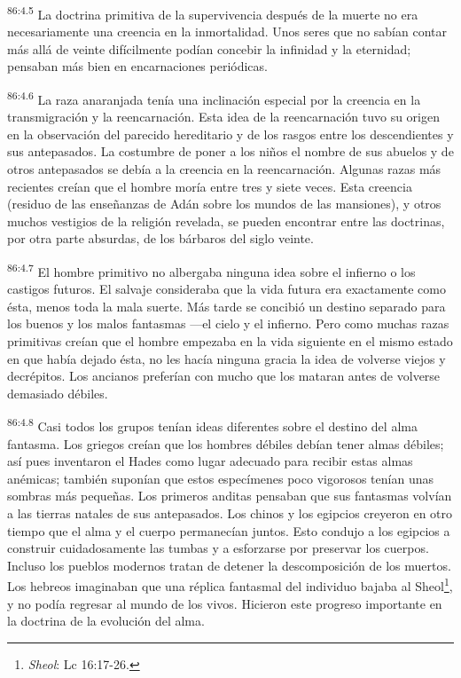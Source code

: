 \documentclass[twoside, 11pt]{book}
\begin{document}
\par
\textsuperscript{86:4.5} La doctrina primitiva de la supervivencia después de la muerte no era necesariamente una creencia en la inmortalidad. Unos seres que no sabían contar más allá de veinte difícilmente podían concebir la infinidad y la eternidad; pensaban más bien en encarnaciones periódicas.

\par
\textsuperscript{86:4.6} La raza anaranjada tenía una inclinación especial por la creencia en la transmigración y la reencarnación. Esta idea de la reencarnación tuvo su origen en la observación del parecido hereditario y de los rasgos entre los descendientes y sus antepasados. La costumbre de poner a los niños el nombre de sus abuelos y de otros antepasados se debía a la creencia en la reencarnación. Algunas razas más recientes creían que el hombre moría entre tres y siete veces. Esta creencia (residuo de las enseñanzas de Adán sobre los mundos de las mansiones), y otros muchos vestigios de la religión revelada, se pueden encontrar entre las doctrinas, por otra parte absurdas, de los bárbaros del siglo veinte.

\par
\textsuperscript{86:4.7} El hombre primitivo no albergaba ninguna idea sobre el infierno o los castigos futuros. El salvaje consideraba que la vida futura era exactamente como ésta, menos toda la mala suerte. Más tarde se concibió un destino separado para los buenos y los malos fantasmas ---el cielo y el infierno. Pero como muchas razas primitivas creían que el hombre empezaba en la vida siguiente en el mismo estado en que había dejado ésta, no les hacía ninguna gracia la idea de volverse viejos y decrépitos. Los ancianos preferían con mucho que los mataran antes de volverse demasiado débiles.

\par
\textsuperscript{86:4.8} Casi todos los grupos tenían ideas diferentes sobre el destino del alma fantasma. Los griegos creían que los hombres débiles debían tener almas débiles; así pues inventaron el Hades como lugar adecuado para recibir estas almas anémicas; también suponían que estos especímenes poco vigorosos tenían unas sombras más pequeñas. Los primeros anditas pensaban que sus fantasmas volvían a las tierras natales de sus antepasados. Los chinos y los egipcios creyeron en otro tiempo que el alma y el cuerpo permanecían juntos. Esto condujo a los egipcios a construir cuidadosamente las tumbas y a esforzarse por preservar los cuerpos. Incluso los pueblos modernos tratan de detener la descomposición de los muertos. Los hebreos imaginaban que una réplica fantasmal del individuo bajaba al Sheol\footnote{\textit{Sheol}: Lc 16:17-26.}, y no podía regresar al mundo de los vivos. Hicieron este progreso importante en la doctrina de la evolución del alma.
\end{document}
